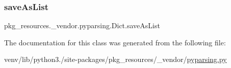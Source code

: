\subsubsection{\texorpdfstring{save\+As\+List}{saveAsList}}
{\footnotesize\ttfamily pkg\+\_\+resources.\+\_\+vendor.\+pyparsing.\+Dict.\+save\+As\+List}



The documentation for this class was generated from the following file\+:\begin{DoxyCompactItemize}
\item 
venv/lib/python3./site-\/packages/pkg\+\_\+resources/\+\_\+vendor/\hyperlink{pkg__resources_2__vendor_2pyparsing_8py}{pyparsing.\+py}\end{DoxyCompactItemize}
